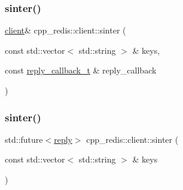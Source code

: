 \mbox{\label{classcpp__redis_1_1client_a67a96ae85449a4dfa6e8976666562be1}} 
\subsubsection{\texorpdfstring{sinter()}{sinter()}\hspace{0.1cm}{\footnotesize\ttfamily [1/2]}}
{\footnotesize\ttfamily \hyperlink{classcpp__redis_1_1client}{client}\& cpp\+\_\+redis\+::client\+::sinter (\begin{DoxyParamCaption}\item[{const std\+::vector$<$ std\+::string $>$ \&}]{keys,  }\item[{const \hyperlink{classcpp__redis_1_1client_a061a1140d36d2eaeda82b09a0bb3f9f2}{reply\+\_\+callback\+\_\+t} \&}]{reply\+\_\+callback }\end{DoxyParamCaption})}

\mbox{\label{classcpp__redis_1_1client_a069df07b6b3f18f5b2c215c67161c115}} 
\subsubsection{\texorpdfstring{sinter()}{sinter()}\hspace{0.1cm}{\footnotesize\ttfamily [2/2]}}
{\footnotesize\ttfamily std\+::future$<$\hyperlink{classcpp__redis_1_1reply}{reply}$>$ cpp\+\_\+redis\+::client\+::sinter (\begin{DoxyParamCaption}\item[{const std\+::vector$<$ std\+::string $>$ \&}]{keys }\end{DoxyParamCaption})}

\mbox{\label{classcpp__redis_1_1client_a55f1722f17eaaa255196851efb0bdb93}} 

